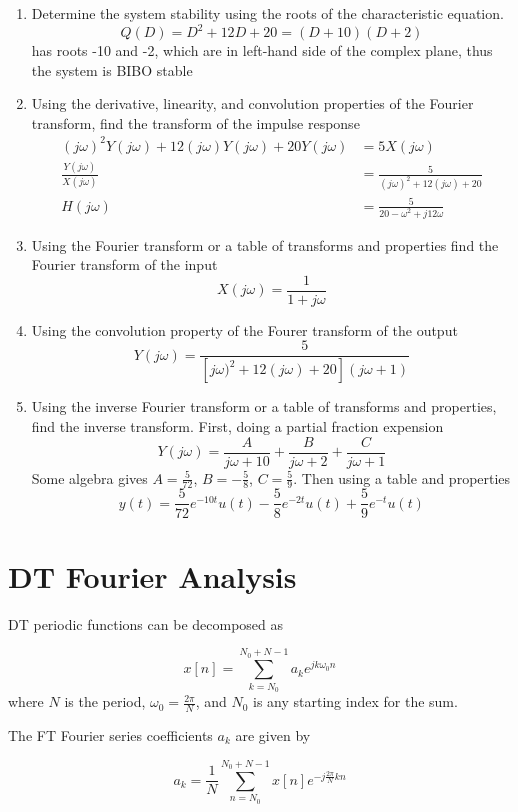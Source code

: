\documentclass{article}
\begin{document}
\begin{enumerate}
\item
  Determine the system stability using the roots of the characteristic equation.
  \[
  Q(D) = D^2 +12D + 20 = (D+10)(D+2)
  \]
  has roots -10 and -2, which are in left-hand side of the complex plane, thus the system is BIBO stable
\item
  Using the derivative, linearity, and convolution  properties of the Fourier transform, find the transform of the impulse response
  \begin{align}
    (j\omega)^2 Y(j\omega) + 12(j\omega)Y(j\omega) + 20Y(j\omega) &= 5X(j\omega)\\
    \frac{Y(j\omega)}{X(j\omega)} &= \frac{5}{(j\omega)^2 + 12(j\omega) + 20}\\
    H(j\omega) &=  \frac{5}{20-\omega^2 + j 12\omega}
  \end{align}

\item
  Using the Fourier transform or a table of transforms and properties find the Fourier transform of the input
  \[
  X(j\omega) = \frac{1}{1+ j\omega}
  \]
\item
  Using the convolution property of the Fourer transform of the output
  \[
  Y(j\omega) = \frac{5}{\left[j\omega)^2 + 12(j\omega) + 20\right](j\omega + 1)}
  \]
\item
  Using the inverse Fourier transform or a table of transforms and properties, find the inverse transform. First, doing a partial fraction expension
  \[
  Y(j\omega) = \frac{A}{j\omega + 10} + \frac{B}{j\omega + 2} + \frac{C}{j\omega + 1}
  \]
  Some algebra gives $A = \frac{5}{72}$, $B = -\frac{5}{8}$, $C = \frac{5}{9}$.
  Then using a table and properties
  \[
  y(t) = \frac{5}{72}e^{-10t}u(t) -\frac{5}{8}e^{-2t}u(t) + \frac{5}{9}e^{-t}u(t)
  \]
\end{enumerate}


\section{DT Fourier Analysis}

DT periodic functions can be decomposed as

\[  
x[n] = \sum\limits_{k = N_0}^{N_0 + N-1} a_k e^{jk\omega_0n}
\]
where $N$ is the period, $\omega_0 = \frac{2\pi}{N}$, and $N_0$ is any starting index for the sum.

The FT Fourier series coefficients $a_k$ are given by

\[
a_k = \frac{1}{N} \sum\limits_{n = N_0}^{N_0+N-1} x[n]e^{-j\frac{2\pi}{N} k n }
\]
\end{document}
